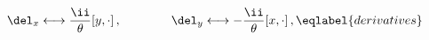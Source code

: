 \begin{equation}
\del_x \longleftrightarrow \frac\ii\theta [y,\cdot]\,, \qquad\qquad
\del_y \longleftrightarrow -\frac\ii\theta [x,\cdot] \,,
\eqlabel{derivatives}
\end{equation}

